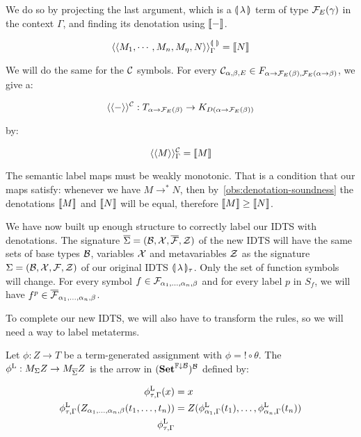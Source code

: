 We do so by projecting the last argument, which is a $\llparenthesis \, \lambda \, \rrparenthesis$
term of type $\mathcal{F}_E(\gamma)$ in the context $\Gamma$, and finding its
denotation using $\llbracket - \rrbracket$.

$$
\langle\langle M_1, \cdots, M_n, M_\eta, N\rangle\rangle^{\llparenthesis \,  \, \rrparenthesis}_\Gamma = \llbracket N \rrbracket
$$

We will do the same for the $\mathcal{C}$ symbols. For every
$\mathcal{C}_{\alpha,\beta,E} \in F_{\alpha \to \mathcal{F}_E(\beta),\mathcal{F}_E(\alpha \to
  \beta)}$, we give a:

$$
\langle\langle-\rangle\rangle^{\mathcal{C}} : T_{\alpha \to \mathcal{F}_E(\beta)} \to K_{D(\alpha \to \mathcal{F}_E(\beta))}
$$

by:

$$
\langle\langle M\rangle\rangle^{\mathcal{C}}_\Gamma = \llbracket M \rrbracket
$$

The semantic label maps must be weakly monotonic. That is a condition that
our maps satisfy: whenever we have $M \to^* N$, then
by~\ref{obs:denotation-soundness} the denotations $\llbracket M \rrbracket$ and $\llbracket N \rrbracket$
will be equal, therefore $\llbracket M \rrbracket \ge \llbracket N \rrbracket$.

We have now built up enough structure to correctly label our IDTS with
denotations. The signature
$\overline{\Sigma} = (\mathcal{B}, \mathcal{X}, \overline{\mathcal{F}}, \mathcal{Z})$ of the new IDTS will
have the same sets of base types $\mathcal{B}$, variables $\mathcal{X}$ and metavariables
$\mathcal{Z}$ as the signature $\Sigma = (\mathcal{B}, \mathcal{X}, \mathcal{F}, \mathcal{Z})$ of our original IDTS
$\llparenthesis \, \lambda \, \rrparenthesis_\tau$. Only the set of function symbols will change. For
every symbol $f \in \mathcal{F}_{\alpha_1,\ldots,\alpha_n,\beta}$ and for every
label $p$ in $S_f$, we will have
$f^p \in \overline{\mathcal{F}}_{\alpha_1,\ldots,\alpha_n,\beta}$.

To complete our new IDTS, we will also have to transform the rules, so we
will need a way to label metaterms.

\begin{definition}
  Let $\phi : Z \to T$ be a term-generated assignment with
  $\phi = ! \circ \theta$. The 
  $\phi^{\mathrm{L}} : M_\Sigma Z \to M_{\overline{\Sigma}} Z$ is the arrow in
  $(\mathbf{Set}^{\mathbb{F}\downarrow\mathcal{B}})^{\mathcal{B}}$ defined by:
  
  \begin{align*}
    \phi^{\mathrm{L}}_{\tau,\Gamma}(x) &= x \\
    \phi^{\mathrm{L}}_{\tau,\Gamma}(Z_{\alpha_1,\ldots,\alpha_n,\beta}(t_1, \ldots, t_n))
    &= Z(\phi^{\mathrm{L}}_{\alpha_1,\Gamma}(t_1), \ldots, \phi^{\mathrm{L}}_{\alpha_n,\Gamma}(t_n)) \\
    \phi^{\mathrm{L}}_{\tau,\Gamma}
  \end{align*}
\end{definition}
